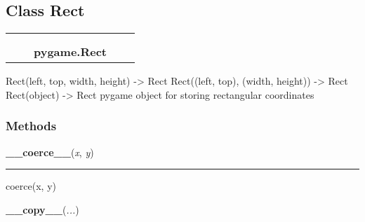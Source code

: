\subsection{Class Rect}

    \label{pygame:Rect}
\begin{tabular}{cccccc}
\multicolumn{2}{r}{\settowidth{\BCL}{object}\multirow{2}{\BCL}{object}}
&&
  \\\cline{3-3}
  &&\multicolumn{1}{c|}{}
&&
  \\
&&\multicolumn{2}{l}{\textbf{pygame.Rect}}
\end{tabular}

Rect(left, top, width, height) -{\textgreater} Rect Rect((left, top), 
(width, height)) -{\textgreater} Rect Rect(object) -{\textgreater} Rect 
pygame object for storing rectangular coordinates



  \subsubsection{Methods}

    \label{pygame:Rect:__coerce__}

    \vspace{0.5ex}

\hspace{.8\funcindent}\begin{boxedminipage}{\funcwidth}

    \raggedright \textbf{\_\_coerce\_\_}(\textit{x}, \textit{y})

    \vspace{-1.5ex}

    \rule{\textwidth}{0.5\fboxrule}
\setlength{\parskip}{2ex}
    coerce(x, y)

\setlength{\parskip}{1ex}
    \end{boxedminipage}

    \label{pygame:Rect:__copy__}

    \vspace{0.5ex}

\hspace{.8\funcindent}\begin{boxedminipage}{\funcwidth}

    \raggedright \textbf{\_\_copy\_\_}(\textit{...})

\setlength{\parskip}{2ex}
\setlength{\parskip}{1ex}
    \end{boxedminipage}

